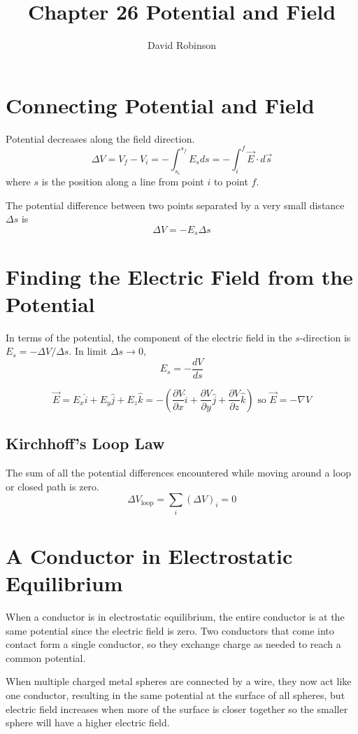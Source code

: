 \documentclass{article}
\title{Chapter 26 Potential and Field}
\author{David Robinson}
\date{}
\begin{document}
\maketitle

\section*{Connecting Potential and Field}

Potential decreases along the field direction.
\[\Delta V=V_f - V_i = -\int_{s_i}^{s_f} E_s ds=-\int_i^f \vec{E}\cdot d\vec{s}\] where $s$ is the
position along a line from point $i$ to point $f$.
\newline

The potential difference between two points separated by a very small distance $\Delta s$ is
\[\Delta V=-E_s \Delta s\]

\section*{Finding the Electric Field from the Potential}

In terms of the potential, the component of the electric field in the $s$-direction is
$E_s = -\Delta V / \Delta s$. In limit $\Delta s\rightarrow 0$,
\[E_s = -\frac{dV}{ds}\]

\[\vec{E}=E_x\hat{i} + E_y\hat{j} + E_z\hat{k}=-(\frac{\partial V}{\partial x}\hat{i}+
\frac{\partial V}{\partial y}\hat{j}+\frac{\partial V}{\partial z}\hat{k})\text{ so }
\vec{E}=-\nabla V\]

\subsection*{Kirchhoff's Loop Law}
The sum of all the potential differences encountered while moving around a loop or closed path is
zero.
\[\Delta V_\text{loop}=\sum_i (\Delta V)_i=0\]
\section*{A Conductor in Electrostatic Equilibrium}

When a conductor is in electrostatic equilibrium, the entire conductor is at the same potential
since the electric field is zero. Two conductors that come into contact form a single conductor, so
they exchange charge as needed to reach a common potential.
\newline

When multiple charged metal spheres are connected by a wire, they now act like one conductor,
resulting in the same potential at the surface of all spheres, but electric field increases when
more of the surface is closer together so the smaller sphere will have a higher electric field.
\end{document}
